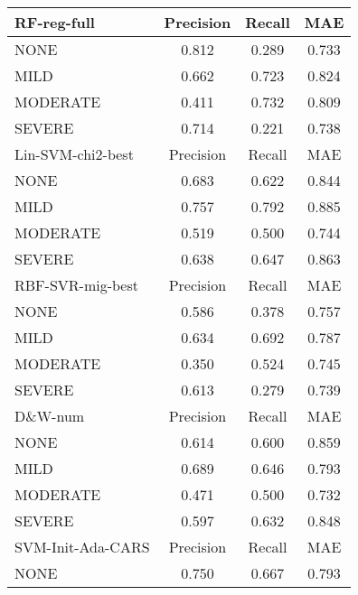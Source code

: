 \begin{table}[]
    \centering
    \begin{tabular}{|l|c|c|c|}
          \hline
   \cellcolor{gray!15} \textsf{RF-reg-full} & \textsf{Precision} & \textsf{Recall} & \textsf{MAE} \\
   \hline
    \textsf{NONE} & \cellcolor{gray!15} 0.812 & 0.289 & 0.733 \\
    \textsf{MILD} & 0.662 & 0.723 & \cellcolor{gray!15} 0.824 \\
    \textsf{MODERATE} & 0.411 & \cellcolor{gray!15} 0.732 & 0.809 \\
    \textsf{SEVERE} & 0.714 & 0.221 & 0.738 \\
   \hline
   \cellcolor{gray!15} \textsf{Lin-SVM-chi2-best} & \textsf{Precision} & \textsf{Recall} & \textsf{MAE} \\
   \hline
    \textsf{NONE} & 0.683 & 0.622 & 0.844 \\
    \textsf{MILD} & \cellcolor{gray!15} 0.757 &\cellcolor{gray!15}  0.792 & \cellcolor{gray!15} 0.885 \\
    \textsf{MODERATE} & 0.519 & 0.500 & 0.744 \\
    \textsf{SEVERE} & 0.638 & 0.647 & 0.863 \\
   \hline
   \cellcolor{gray!15} \textsf{RBF-SVR-mig-best} & \textsf{Precision} & \textsf{Recall} & \textsf{MAE} \\
   \hline
    \textsf{NONE} & 0.586 & 0.378 & 0.757 \\
    \textsf{MILD} & \cellcolor{gray!15} 0.634 & \cellcolor{gray!15} 0.692 & \cellcolor{gray!15} 0.787 \\
    \textsf{MODERATE} & 0.350 & 0.524 & 0.745 \\
    \textsf{SEVERE} & 0.613 & 0.279 & 0.739 \\
   \hline
   \cellcolor{gray!15} \textsf{D\&W-num} & \textsf{Precision} & \textsf{Recall} & \textsf{MAE} \\
   \hline
    \textsf{NONE} & 0.614 & 0.600 & \cellcolor{gray!15} 0.859 \\
    \textsf{MILD} & \cellcolor{gray!15} 0.689 & \cellcolor{gray!15} 0.646 & 0.793 \\
    \textsf{MODERATE} & 0.471 & 0.500 & 0.732 \\
    \textsf{SEVERE} & 0.597 & 0.632 & 0.848 \\
   \hline
   \cellcolor{gray!15} \textsf{SVM-Init-Ada-CARS} & \textsf{Precision} & \textsf{Recall} & \textsf{MAE} \\
   \hline
    \textsf{NONE} & 0.750 & 0.667 & 0.793 \\

\end{tabular}
\end{table}
